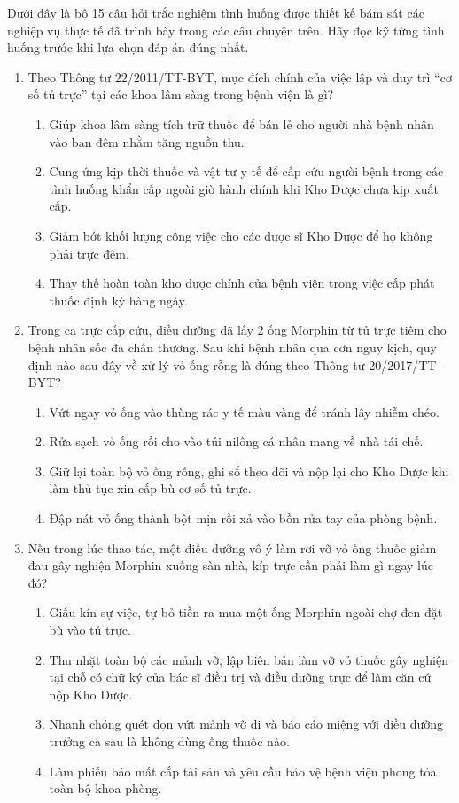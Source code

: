 \documentclass[12pt,a4paper]{article}
\begin{document}
Dưới đây là bộ 15 câu hỏi trắc nghiệm tình huống được thiết kế bám sát các nghiệp vụ thực tế đã trình bày trong các câu chuyện trên. Hãy đọc kỹ từng tình huống trước khi lựa chọn đáp án đúng nhất.

\begin{enumerate}[label=\textbf{Câu \arabic*:}, leftmargin=*]

\item Theo Thông tư 22/2011/TT-BYT, mục đích chính của việc lập và duy trì ``cơ số tủ trực'' tại các khoa lâm sàng trong bệnh viện là gì?
\begin{enumerate}[label=\textbf{\Alph*.}]
    \item Giúp khoa lâm sàng tích trữ thuốc để bán lẻ cho người nhà bệnh nhân vào ban đêm nhằm tăng nguồn thu.
    \item Cung ứng kịp thời thuốc và vật tư y tế để cấp cứu người bệnh trong các tình huống khẩn cấp ngoài giờ hành chính khi Kho Dược chưa kịp xuất cấp.
    \item Giảm bớt khối lượng công việc cho các dược sĩ Kho Dược để họ không phải trực đêm.
    \item Thay thế hoàn toàn kho dược chính của bệnh viện trong việc cấp phát thuốc định kỳ hàng ngày.
\end{enumerate}

\item Trong ca trực cấp cứu, điều dưỡng đã lấy 2 ống Morphin từ tủ trực tiêm cho bệnh nhân sốc đa chấn thương. Sau khi bệnh nhân qua cơn nguy kịch, quy định nào sau đây về xử lý vỏ ống rỗng là đúng theo Thông tư 20/2017/TT-BYT?
\begin{enumerate}[label=\textbf{\Alph*.}]
    \item Vứt ngay vỏ ống vào thùng rác y tế màu vàng để tránh lây nhiễm chéo.
    \item Rửa sạch vỏ ống rồi cho vào túi nilông cá nhân mang về nhà tái chế.
    \item Giữ lại toàn bộ vỏ ống rỗng, ghi sổ theo dõi và nộp lại cho Kho Dược khi làm thủ tục xin cấp bù cơ số tủ trực.
    \item Đập nát vỏ ống thành bột mịn rồi xả vào bồn rửa tay của phòng bệnh.
\end{enumerate}

\item Nếu trong lúc thao tác, một điều dưỡng vô ý làm rơi vỡ vỏ ống thuốc giảm đau gây nghiện Morphin xuống sàn nhà, kíp trực cần phải làm gì ngay lúc đó?
\begin{enumerate}[label=\textbf{\Alph*.}]
    \item Giấu kín sự việc, tự bỏ tiền ra mua một ống Morphin ngoài chợ đen đặt bù vào tủ trực.
    \item Thu nhặt toàn bộ các mảnh vỡ, lập biên bản làm vỡ vỏ thuốc gây nghiện tại chỗ có chữ ký của bác sĩ điều trị và điều dưỡng trực để làm căn cứ nộp Kho Dược.
    \item Nhanh chóng quét dọn vứt mảnh vỡ đi và báo cáo miệng với điều dưỡng trưởng ca sau là không dùng ống thuốc nào.
    \item Làm phiếu báo mất cắp tài sản và yêu cầu bảo vệ bệnh viện phong tỏa toàn bộ khoa phòng.
\end{enumerate}


\end{enumerate}
\end{document}
